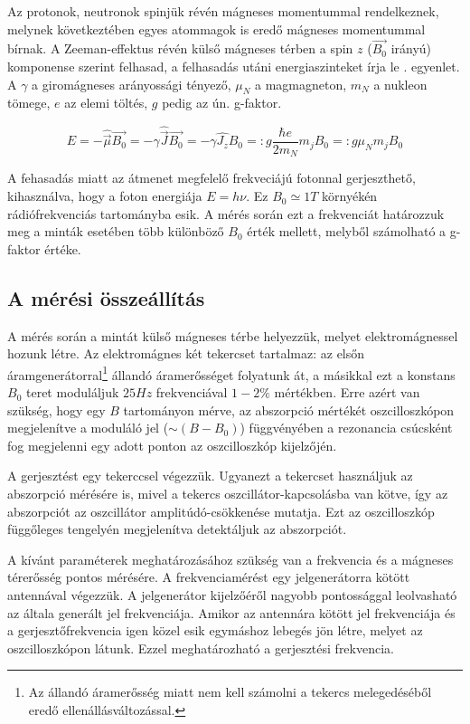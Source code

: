\documentclass[a4paper,12pt]{article}
\begin{document}
Az protonok, neutronok spinjük révén mágneses momentummal rendelkeznek, melynek következtében egyes atommagok is eredő mágneses momentummal bírnak. A Zeeman-effektus révén külső mágneses térben a spin $z$ ($\vec{B_0}$ irányú) komponense szerint felhasad, a felhasadás utáni energiaszinteket írja le . egyenlet. A $\gamma$ a giromágneses arányossági tényező, $\mu_N$ a magmagneton, $m_N$ a nukleon tömege, $e$ az elemi töltés, $g$ pedig az ún. g-faktor.

\begin{equation}
	E = -\hat{\vec{\mu}}\vec{B_0} = -\gamma \hat{\vec{J}}\vec{B_0}=-\gamma \hat{J_z}B_0 =: g\frac{\hbar e}{2m_N}m_j B_0=:g\mu_Nm_jB_0
	\label{eq:zeeman}
\end{equation}

A fehasadás miatt az átmenet megfelelő frekveciájú fotonnal gerjeszthető, kihasználva, hogy a foton energiája $E=h \nu$. Ez $B_0\simeq 1T$ környékén rádiófrekvenciás tartományba esik. A mérés során ezt a frekvenciát határozzuk meg a minták esetében több különböző $B_0$ érték mellett, melyből számolható a g-faktor értéke.

\subsection{A mérési összeállítás}

A mérés során a mintát külső mágneses térbe helyezzük, melyet elektromágnessel hozunk létre. Az elektromágnes két tekercset tartalmaz: az elsőn áramgenerátorral\footnote{Az állandó áramerősség miatt nem kell számolni a tekercs melegedéséből eredő ellenállásváltozással.} állandó áramerősséget folyatunk át, a másikkal ezt a konstans $B_0$ teret moduláljuk $25Hz$ frekvenciával $1-2\%$ mértékben. Erre azért van szükség, hogy egy $B$ tartományon mérve, az abszorpció mértékét oszcilloszkópon megjelenítve a moduláló jel ($\sim (B-B_0)$) függvényében a rezonancia csúcsként fog megjelenni egy adott ponton az oszcilloszkóp kijelzőjén.

A gerjesztést egy tekerccsel végezzük. Ugyanezt a tekercset használjuk az abszorpció mérésére is, mivel a tekercs oszcillátor-kapcsolásba van kötve, így az abszorpciót az oszcillátor amplitúdó-csökkenése mutatja. Ezt az oszcilloszkóp függőleges tengelyén megjelenítva detektáljuk az abszorpciót. 

A kívánt paraméterek meghatározásához szükség van a frekvencia és a mágneses térerősség pontos mérésére. A frekvenciamérést egy jelgenerátorra kötött antennával végezzük. A jelgenerátor kijelzőéről nagyobb pontossággal leolvasható az általa generált jel frekvenciája. Amikor az antennára kötött jel frekvenciája és a gerjesztőfrekvencia igen közel esik egymáshoz lebegés jön létre, melyet az oszcilloszkópon látunk. Ezzel meghatározható a gerjesztési frekvencia.
\end{document}
